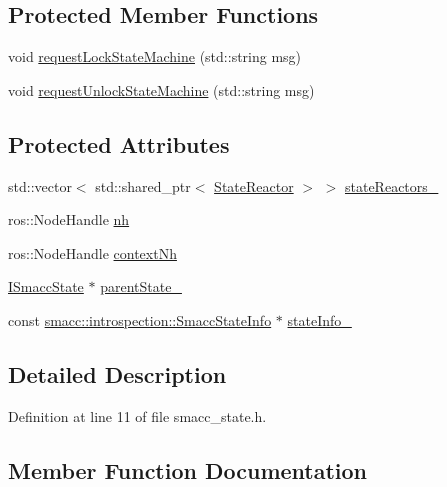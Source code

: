 \subsection*{Protected Member Functions}
\begin{DoxyCompactItemize}
\item 
void \hyperlink{classsmacc_1_1ISmaccState_ae733140761345e027713bd622d93bf0f}{request\+Lock\+State\+Machine} (std\+::string msg)
\item 
void \hyperlink{classsmacc_1_1ISmaccState_a3bf006f25d5b9c0534c8e89ae2e93d40}{request\+Unlock\+State\+Machine} (std\+::string msg)
\end{DoxyCompactItemize}
\subsection*{Protected Attributes}
\begin{DoxyCompactItemize}
\item 
std\+::vector$<$ std\+::shared\+\_\+ptr$<$ \hyperlink{classsmacc_1_1StateReactor}{State\+Reactor} $>$ $>$ \hyperlink{classsmacc_1_1ISmaccState_a7410a353b515f7b7357e94ef619a6c45}{state\+Reactors\+\_\+}
\item 
ros\+::\+Node\+Handle \hyperlink{classsmacc_1_1ISmaccState_a13fe6e6abfdb87996402189d44b78494}{nh}
\item 
ros\+::\+Node\+Handle \hyperlink{classsmacc_1_1ISmaccState_ae59191a663a08489b7d10036f3b25238}{context\+Nh}
\item 
\hyperlink{classsmacc_1_1ISmaccState}{I\+Smacc\+State} $\ast$ \hyperlink{classsmacc_1_1ISmaccState_ad61db41d8d06a836e7d1dac7767f5695}{parent\+State\+\_\+}
\item 
const \hyperlink{classsmacc_1_1introspection_1_1SmaccStateInfo}{smacc\+::introspection\+::\+Smacc\+State\+Info} $\ast$ \hyperlink{classsmacc_1_1ISmaccState_af20df2cfd3aa826fe02a3d703dc63c1b}{state\+Info\+\_\+}
\end{DoxyCompactItemize}


\subsection{Detailed Description}


Definition at line 11 of file smacc\+\_\+state.\+h.



\subsection{Member Function Documentation}
